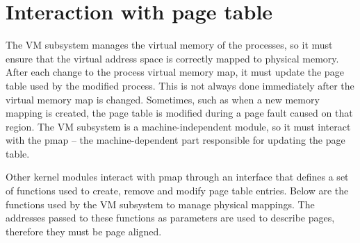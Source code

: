 %

\section{Interaction with page table}

The VM subsystem manages the virtual memory of the processes,
so it must ensure that the virtual address space is correctly mapped to physical memory.
After each change to the process virtual memory map, it must update the page table used by the modified process.
This is not always done immediately after the virtual memory map is changed.
Sometimes, such as when a new memory mapping is created, the page table is modified during a page fault caused on that region.
The VM subsystem is a machine-independent module, so it must interact with the pmap
-- the machine-dependent part responsible for updating the page table.

Other kernel modules interact with pmap through an interface that defines a set of functions used to create, remove and modify page table entries.
Below are the functions used by the VM subsystem to manage physical mappings.
The addresses passed to these functions as parameters are used to describe pages, therefore they must be page aligned.

